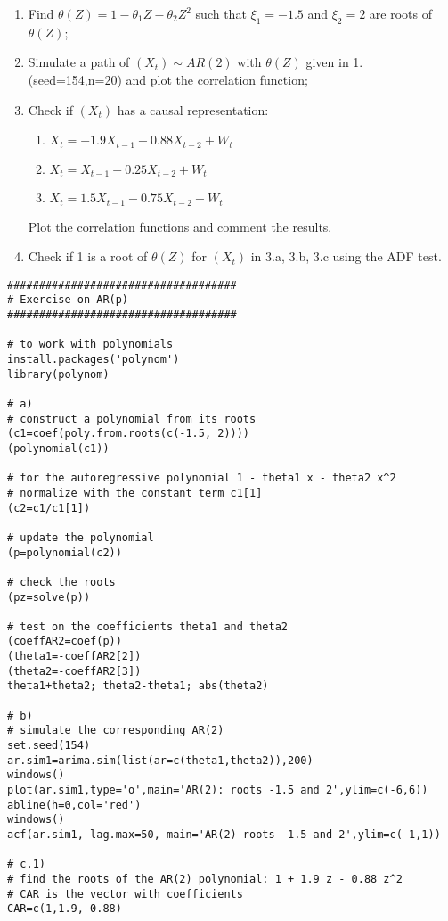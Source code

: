 \begin{example}
    \begin{enumerate}
        \item Find $\theta(Z)=1-\theta_1Z-\theta_2Z^2$ such that $\xi_1=-1.5$ and $\xi_2=2$ are roots of $\theta(Z)$;
        \item Simulate a path of $(X_t)\sim AR(2)$ with $\theta(Z)$ given in 1. (seed=154,n=20) and plot the correlation function;
        \item Check if $(X_t)$ has a causal representation:
        \begin{enumerate}
            \item $X_t=-1.9X_{t-1}+0.88X_{t-2}+W_t$
            \item $X_t=X_{t-1}-0.25X_{t-2}+W_t$
            \item $X_t=1.5X_{t-1}-0.75X_{t-2}+W_t$
        \end{enumerate}
        Plot the correlation functions and comment the results.
        \item Check if 1 is a root of $\theta(Z)$ for $(X_t)$ in 3.a, 3.b, 3.c using the ADF test.
    \end{enumerate}

    \begin{verbatim}
####################################
# Exercise on AR(p)
####################################

# to work with polynomials
install.packages('polynom')
library(polynom)

# a)
# construct a polynomial from its roots
(c1=coef(poly.from.roots(c(-1.5, 2))))
(polynomial(c1))

# for the autoregressive polynomial 1 - theta1 x - theta2 x^2
# normalize with the constant term c1[1]
(c2=c1/c1[1])

# update the polynomial
(p=polynomial(c2))

# check the roots
(pz=solve(p))

# test on the coefficients theta1 and theta2
(coeffAR2=coef(p))
(theta1=-coeffAR2[2])
(theta2=-coeffAR2[3])
theta1+theta2; theta2-theta1; abs(theta2)

# b)
# simulate the corresponding AR(2)
set.seed(154)
ar.sim1=arima.sim(list(ar=c(theta1,theta2)),200)
windows()
plot(ar.sim1,type='o',main='AR(2): roots -1.5 and 2',ylim=c(-6,6))
abline(h=0,col='red')
windows()
acf(ar.sim1, lag.max=50, main='AR(2) roots -1.5 and 2',ylim=c(-1,1))

# c.1)
# find the roots of the AR(2) polynomial: 1 + 1.9 z - 0.88 z^2
# CAR is the vector with coefficients
CAR=c(1,1.9,-0.88)


\end{verbatim}
\end{example}
